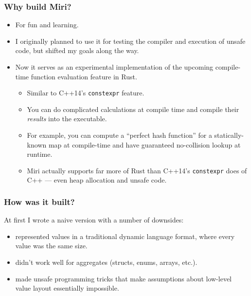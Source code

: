 \documentclass{beamer}
\begin{document}
\begin{frame}
  \frametitle{Why build Miri?}
  \begin{itemize}
    \item For fun and learning.

    \item I originally planned to use it for testing the compiler and execution
      of unsafe code, but shifted my goals along the way. \pause

    \item Now it serves as an experimental implementation of the upcoming
      compile-time function evaluation feature in Rust. \pause

      \begin{itemize}
        \item Similar to C++14's \texttt{constexpr} feature.

        \item You can do complicated calculations at compile time and compile
          their \emph{results} into the executable. \pause

        \item For example, you can compute a ``perfect hash function'' for a
          statically-known map at compile-time and have guaranteed no-collision
          lookup at runtime. \pause

        \item Miri actually supports far more of Rust than C++14's
          \texttt{constexpr} does of C++ --- even heap allocation and
          unsafe code.
      \end{itemize}
  \end{itemize}
\end{frame}

\begin{frame}
  \frametitle{How was it built?}

  At first I wrote a naive version with a number of downsides:

  \begin{itemize}
    \item represented values in a traditional dynamic language format, where
      every value was the same size.

    \item didn't work well for aggregates (structs, enums, arrays, etc.).

    \item made unsafe programming tricks that make assumptions about low-level
      value layout essentially impossible.
  \end{itemize}
\end{frame}
\end{document}
